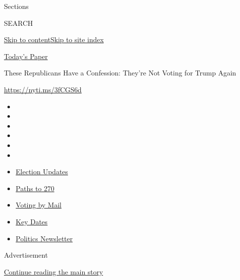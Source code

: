Sections

SEARCH

\protect\hyperlink{site-content}{Skip to
content}\protect\hyperlink{site-index}{Skip to site index}

\href{https://myaccount.nytimes3xbfgragh.onion/auth/login?response_type=cookie\&client_id=vi}{}

\href{https://www.nytimes3xbfgragh.onion/section/todayspaper}{Today's
Paper}

These Republicans Have a Confession: They're Not Voting for Trump Again

\url{https://nyti.ms/3fCGS6d}

\begin{itemize}
\item
\item
\item
\item
\item
\item
\end{itemize}

\begin{itemize}
\item
  \href{https://www.nytimes3xbfgragh.onion/live/2020/09/08/us/trump-vs-biden?action=click\&pgtype=Article\&state=default\&region=TOP_BANNER\&context=storylines_menu}{Election
  Updates}
\item
  \href{https://www.nytimes3xbfgragh.onion/interactive/2020/us/elections/election-states-biden-trump.html?action=click\&pgtype=Article\&state=default\&region=TOP_BANNER\&context=storylines_menu}{Paths
  to 270}
\item
  \href{https://www.nytimes3xbfgragh.onion/interactive/2020/08/31/us/politics/vote-by-mail-deadlines.html?action=click\&pgtype=Article\&state=default\&region=TOP_BANNER\&context=storylines_menu}{Voting
  by Mail}
\item
  \href{https://www.nytimes3xbfgragh.onion/interactive/2019/us/elections/2020-presidential-election-calendar.html?action=click\&pgtype=Article\&state=default\&region=TOP_BANNER\&context=storylines_menu}{Key
  Dates}
\item
  \href{https://www.nytimes3xbfgragh.onion/newsletters/politics?action=click\&pgtype=Article\&state=default\&region=TOP_BANNER\&context=storylines_menu}{Politics
  Newsletter}
\end{itemize}

Advertisement

\protect\hyperlink{after-top}{Continue reading the main story}

